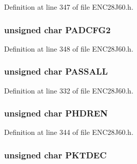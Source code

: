 Definition at line 347 of file E\+N\+C28\+J60.\+h.

\hypertarget{union___r_e_g_abe937a96b164ff92b7a3f65b65ae7ba0}{}
\subsubsection[{P\+A\+D\+C\+F\+G2}]{\setlength{\rightskip}{0pt plus 5cm}unsigned {\bf char} P\+A\+D\+C\+F\+G2}\label{union___r_e_g_abe937a96b164ff92b7a3f65b65ae7ba0}


Definition at line 348 of file E\+N\+C28\+J60.\+h.

\hypertarget{union___r_e_g_aa3ec84214cb6d4f199496b963b54b4a3}{}
\subsubsection[{P\+A\+S\+S\+A\+L\+L}]{\setlength{\rightskip}{0pt plus 5cm}unsigned {\bf char} P\+A\+S\+S\+A\+L\+L}\label{union___r_e_g_aa3ec84214cb6d4f199496b963b54b4a3}


Definition at line 332 of file E\+N\+C28\+J60.\+h.

\hypertarget{union___r_e_g_a48c75f071e3cc780a645bc5d28d3a0fd}{}
\subsubsection[{P\+H\+D\+R\+E\+N}]{\setlength{\rightskip}{0pt plus 5cm}unsigned {\bf char} P\+H\+D\+R\+E\+N}\label{union___r_e_g_a48c75f071e3cc780a645bc5d28d3a0fd}


Definition at line 344 of file E\+N\+C28\+J60.\+h.

\hypertarget{union___r_e_g_aed986545931aba622e242b1eb077d57f}{}
\subsubsection[{P\+K\+T\+D\+E\+C}]{\setlength{\rightskip}{0pt plus 5cm}unsigned {\bf char} P\+K\+T\+D\+E\+C}\label{union___r_e_g_aed986545931aba622e242b1eb077d57f}


